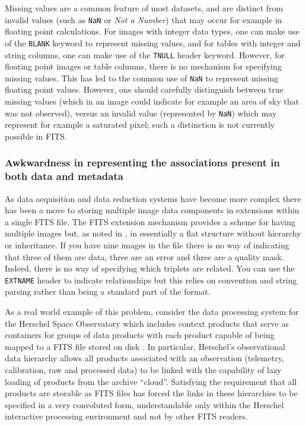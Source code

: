 \documentclass[final,authoryear,5p,times,twocolumn]{elsarticle}
\begin{document}
{{Missing values are a common feature of most datasets, and are distinct from
invalid values (such as \texttt{NaN} or \textit{Not a Number}) that may occur
for example in floating point calculations. For images with integer data
types, one can make use of the \texttt{BLANK} keyword to represent missing
values, and for tables with integer and string columns, one can make use of
the \texttt{TNULL} header keyword. However, for floating point images or
table columns, there is no mechanism for specifying missing values. This has
led to the common use of \texttt{NaN} to represent missing floating point
values. However, one should carefully distinguish between true missing values
(which in an image could indicate for example an area of sky that was not
observed), versus an invalid value (represented by \texttt{NaN}) which may
represent for example a saturated pixel; such a distinction is not currently possible
in FITS.


\subsubsection{Awkwardness in representing the associations present in both data and metadata}
\label{section_associations}


As data acquisition and data reduction systems have become more
complex there has been a move to storing multiple image data
components in extensions within a single FITS file. The FITS extension
mechanism provides a scheme for having multiple images but, as noted
in \citet{2003ASSL..285...71G}, in essentially a flat structure
without hierarchy or inheritance. If you have nine images in the file
there is no way of indicating that three of them are data, three are an error
and three are a quality mask. Indeed, there is no way of specifying which
triplets are related. You can use the \texttt{EXTNAME} header to
indicate relationships but this relies on convention and string
parsing rather than being a standard part of the format.


As a real world example of this problem, consider the data processing
system for the Herschel Space Observatory which includes
context products that serve as containers for groups of data products
with each product capable of being mapped to a
FITS file stored on disk
\citep[see the Herschel architecture and design document;][]{2008HerschelDesign}.
In particular, Herschel's observational data
hierarchy allows all products associated with an observation (telemetry,
calibration, raw and processed data) to be linked with the capability of
lazy loading of products from the archive ``cloud''.
Satisfying the requirement that all products are storable as FITS files
has forced the links in these hierarchies to be specified in a very
convoluted form, understandable only within the
Herschel interactive processing environment
\citep[HIPE;][]{2010ASPC..434..139O} and not by other FITS readers.


}}
\end{document}
